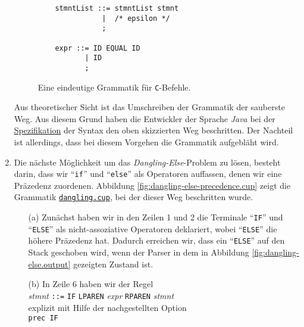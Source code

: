 \begin{enumerate}
\begin{figure}[!ht]
\begin{Verbatim}
    stmntList ::= stmntList stmnt 
               |  /* epsilon */
               ;
    
    expr ::= ID EQUAL ID
           | ID
           ;
    \end{Verbatim}
    \vspace*{-0.3cm}
    \caption{Eine eindeutige Grammatik f\"ur \texttt{C}-Befehle.}
    \label{fig:dangling-else-correct.cup}
\end{figure}

      Aus theoretischer Sicht ist das Umschreiben der Grammatik der sauberste Weg.  
      Aus diesem Grund haben die Entwickler der Sprache \textsl{Java} \cite{gosling:96} bei der
      \href{http://titanium.cs.berkeley.edu/doc/java-langspec-1.0/14.doc.html#5991}{Spezifikation}
      der Syntax den oben skizzierten Weg beschritten.   
      Der Nachteil ist allerdings, dass bei diesem Vorgehen die Grammatik aufgebl\"aht wird. 
\item Die n\"achste M\"oglichkeit um das \emph{Dangling-Else}-Problem zu l\"osen, besteht darin, dass
      wir ``\texttt{if}'' und ``\texttt{else}'' als Operatoren auffassen, denen wir eine Pr\"azedenz
      zuordenen.  Abbildung \ref{fig:dangling-else-precedence.cup} zeigt die Grammatik
      \href{https://github.com/karlstroetmann/Formal-Languages/tree/master/Cup/DanglingOperator/dangling.cup}{\texttt{dangling.cup}},
      bei der dieser Weg beschritten wurde.
      \begin{enumerate}
      \item[(a)] Zun\"achst haben wir in den Zeilen 1 und 2 die Terminale ``\texttt{IF}'' und
            ``\texttt{ELSE}''  als
            nicht-assoziative Operatoren deklariert, wobei ``\texttt{ELSE}'' die h\"ohere Pr\"azedenz
            hat.  Dadurch erreichen wir, dass ein ``\texttt{ELSE}'' auf den Stack geschoben wird,
            wenn der Parser in dem in Abbildung \ref{fig:dangling-else.output} gezeigten Zustand ist.
      \item[(b)] In Zeile 6 haben wir der Regel
            \\[0.2cm]
            \hspace*{1.3cm}
            \textsl{stmnt} \texttt{::=} \texttt{IF} \texttt{LPAREN} \textsl{expr} \texttt{RPAREN} \textsl{stmnt}
            \\[0.2cm]      
            explizit mit Hilfe der nachgestellten Option
            \\[0.2cm]
            \hspace*{1.3cm}
            \texttt{prec IF}

\end{enumerate}
\end{enumerate}
